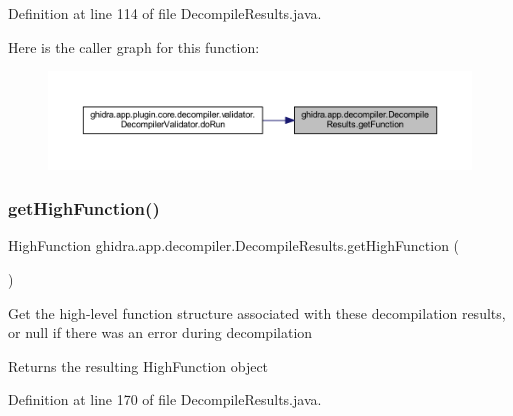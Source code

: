 Definition at line 114 of file Decompile\+Results.\+java.

Here is the caller graph for this function\+:
\nopagebreak
\begin{figure}[H]
\begin{center}
\leavevmode
\includegraphics[width=350pt]{classghidra_1_1app_1_1decompiler_1_1_decompile_results_ae0f744db17c1404de98c893d27d30095_icgraph}
\end{center}
\end{figure}
\mbox{\label{classghidra_1_1app_1_1decompiler_1_1_decompile_results_a47a5e5504a7d915f1edecbca48977e2e}} 
\subsubsection{\texorpdfstring{getHighFunction()}{getHighFunction()}}
{\footnotesize\ttfamily High\+Function ghidra.\+app.\+decompiler.\+Decompile\+Results.\+get\+High\+Function (\begin{DoxyParamCaption}{ }\end{DoxyParamCaption})\hspace{0.3cm}{\ttfamily [inline]}}

Get the high-\/level function structure associated with these decompilation results, or null if there was an error during decompilation \begin{DoxyReturn}{Returns}
the resulting High\+Function object 
\end{DoxyReturn}


Definition at line 170 of file Decompile\+Results.\+java.

